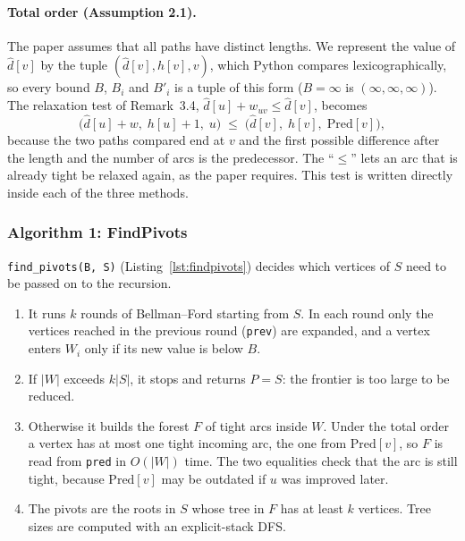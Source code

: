 \paragraph{Total order (Assumption 2.1).} The paper assumes that all paths have distinct
lengths. We represent the value of $\hat{d}[v]$ by the tuple $(\hat{d}[v], h[v], v)$, which
Python compares lexicographically, so every bound $B$, $B_i$ and $B'_i$ is a tuple of this
form ($B=\infty$ is $(\infty,\infty,\infty)$). The relaxation test of Remark~3.4,
$\hat{d}[u]+w_{uv}\le\hat{d}[v]$, becomes
\begin{equation*}
  \bigl(\hat{d}[u]+w,\; h[u]+1,\; u\bigr) \;\le\; \bigl(\hat{d}[v],\; h[v],\; \mathrm{Pred}[v]\bigr),
\end{equation*}
because the two paths compared end at $v$ and the first possible difference after the
length and the number of arcs is the predecessor. The ``$\le$'' lets an arc that is already
tight be relaxed again, as the paper requires. This test is written directly inside each of
the three methods.

\subsubsection{Algorithm 1: FindPivots}

\texttt{find\_pivots(B, S)} (Listing~\ref{lst:findpivots}) decides which vertices of $S$
need to be passed on to the recursion.
\begin{enumerate}
  \item It runs $k$ rounds of Bellman--Ford starting from $S$. In each round only the
        vertices reached in the previous round (\texttt{prev}) are expanded, and a vertex
        enters $W_i$ only if its new value is below $B$.
  \item If $|W|$ exceeds $k|S|$, it stops and returns $P=S$: the frontier is too large to
        be reduced.
  \item Otherwise it builds the forest $F$ of tight arcs inside $W$. Under the total order
        a vertex has at most one tight incoming arc, the one from $\mathrm{Pred}[v]$, so
        $F$ is read from \texttt{pred} in $O(|W|)$ time. The two equalities check that the
        arc is still tight, because $\mathrm{Pred}[v]$ may be outdated if $u$ was improved
        later.
  \item The pivots are the roots in $S$ whose tree in $F$ has at least $k$ vertices. Tree
        sizes are computed with an explicit-stack DFS.
\end{enumerate}

